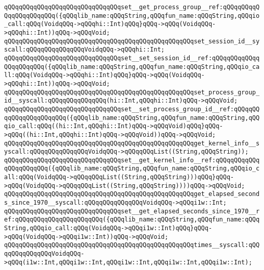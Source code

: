\verb|qQQqqQQqqQQqqQQqqQQqqQQqqQQqqQQqset__get_process_group__ref:qQQqqQQqqQQqqQQqqQQqqQQq({qQQqlib_name:qQQqString,qQQqfun_name:qQQqString,qQQqio_call:qQQq(VoidqQQq->qQQqhi::Int)qQQq}qQQq->qQQq(VoidqQQq->qQQqhi::Int))qQQq->qQQqVoid;|\newline
\newline
\verb|qQQqqQQqqQQqqQQqqQQqqQQqqQQqqQQqqQQqqQQqqQQqqQQqqQQqset_session_id__syscall:qQQqqQQqqQQqqQQqVoidqQQq->qQQqhi::Int;|\newline
\verb|qQQqqQQqqQQqqQQqqQQqqQQqqQQqqQQqset__set_session_id__ref:qQQqqQQqqQQqqQQqqQQqqQQq({qQQqlib_name:qQQqString,qQQqfun_name:qQQqString,qQQqio_call:qQQq(VoidqQQq->qQQqhi::Int)qQQq}qQQq->qQQq(VoidqQQq->qQQqhi::Int))qQQq->qQQqVoid;|\newline
\newline
\verb|qQQqqQQqqQQqqQQqqQQqqQQqqQQqqQQqqQQqqQQqqQQqqQQqqQQqset_process_group_id__syscall:qQQqqQQqqQQqqQQq(hi::Int,qQQqhi::Int)qQQq->qQQqVoid;|\newline
\verb|qQQqqQQqqQQqqQQqqQQqqQQqqQQqqQQqset__set_process_group_id__ref:qQQqqQQqqQQqqQQqqQQqqQQq({qQQqlib_name:qQQqString,qQQqfun_name:qQQqString,qQQqio_call:qQQq((hi::Int,qQQqhi::Int)qQQq->qQQqVoid)qQQq}qQQq->qQQq((hi::Int,qQQqhi::Int)qQQq->qQQqVoid))qQQq->qQQqVoid;|\newline
\newline
\verb|qQQqqQQqqQQqqQQqqQQqqQQqqQQqqQQqqQQqqQQqqQQqqQQqqQQqget_kernel_info__syscall:qQQqqQQqqQQqqQQqVoidqQQq->qQQqqQQqList((String,qQQqString));|\newline
\verb|qQQqqQQqqQQqqQQqqQQqqQQqqQQqqQQqset__get_kernel_info__ref:qQQqqQQqqQQqqQQqqQQqqQQq({qQQqlib_name:qQQqString,qQQqfun_name:qQQqString,qQQqio_call:qQQq(VoidqQQq->qQQqqQQqList((String,qQQqString)))qQQq}qQQq->qQQq(VoidqQQq->qQQqqQQqList((String,qQQqString))))qQQq->qQQqVoid;|\newline
\newline
\verb|qQQqqQQqqQQqqQQqqQQqqQQqqQQqqQQqqQQqqQQqqQQqqQQqqQQqget_elapsed_seconds_since_1970__syscall:qQQqqQQqqQQqqQQqVoidqQQq->qQQqi1w::Int;|\newline
\verb|qQQqqQQqqQQqqQQqqQQqqQQqqQQqqQQqset__get_elapsed_seconds_since_1970__ref:qQQqqQQqqQQqqQQqqQQqqQQq({qQQqlib_name:qQQqString,qQQqfun_name:qQQqString,qQQqio_call:qQQq(VoidqQQq->qQQqi1w::Int)qQQq}qQQq->qQQq(VoidqQQq->qQQqi1w::Int))qQQq->qQQqVoid;|\newline
\newline
\verb|qQQqqQQqqQQqqQQqqQQqqQQqqQQqqQQqqQQqqQQqqQQqqQQqqQQqtimes__syscall:qQQqqQQqqQQqqQQqVoidqQQq->qQQq(i1w::Int,qQQqi1w::Int,qQQqi1w::Int,qQQqi1w::Int,qQQqi1w::Int);|\newline
